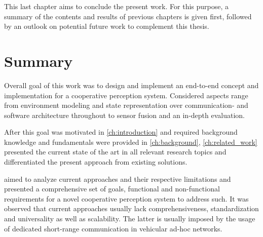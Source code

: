 This last chapter aims to conclude the present work. For this purpose, a summary of the contents and results of previous chapters is given first, followed by an outlook on potential future work to complement this thesis.

\section{Summary}
\label{sec:conclusion:summary}
Overall goal of this work was to design and implement an end-to-end concept and implementation for a cooperative perception system. Considered aspects range from environment modeling and state representation over communication- and software architecture throughout to sensor fusion and an in-depth evaluation. 
\par
\bigskip

After this goal was motivated in \cref{ch:introduction} and required background knowledge and fundamentals were provided in \cref{ch:background}, \cref{ch:related_work} presented the current state of the art in all relevant research topics and differentiated the present approach from existing solutions. 
\par
\bigskip

 aimed to analyze current approaches and their respective limitations and presented a comprehensive set of goals, functional and non-functional requirements for a novel cooperative perception system to address such. It was observed that current approaches usually lack comprehensiveness, standardization and universality as well as scalability. The latter is usually imposed by the usage of dedicated short-range communication in vehicular ad-hoc networks.  
\par
\bigskip

